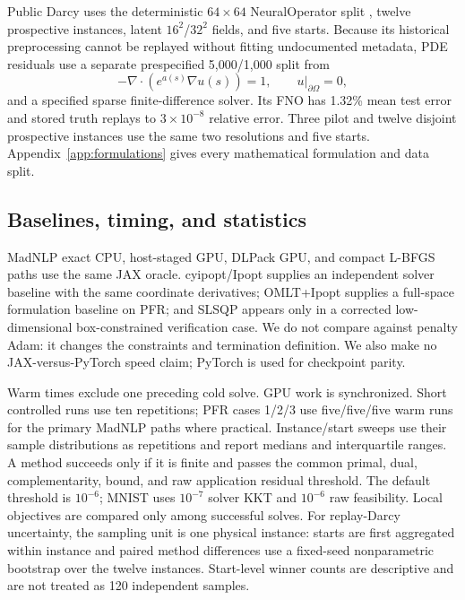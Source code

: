 Public Darcy uses the deterministic $64\times64$ NeuralOperator split
\citep{li2021fno,kovachki2023neuraloperator}, twelve prospective instances,
latent $16^2$/$32^2$ fields, and five starts.  Because its historical
preprocessing cannot be replayed without fitting undocumented metadata, PDE
residuals use a separate prespecified 5,000/1,000 split from
\begin{equation}
-\nabla\!\cdot\!\left(e^{a(s)}\nabla u(s)\right)=1,
\qquad u|_{\partial\Omega}=0,
\label{eq:darcy}
\end{equation}
and a specified sparse finite-difference solver.  Its FNO has 1.32\% mean test
error and stored truth replays to $3\times10^{-8}$ relative error.  Three pilot
and twelve disjoint prospective instances use the same two resolutions and
five starts.  Appendix~\ref{app:formulations} gives every mathematical
formulation and data split.

\subsection{Baselines, timing, and statistics}

MadNLP exact CPU, host-staged GPU, DLPack GPU, and compact L-BFGS paths use the
same JAX oracle.  cyipopt/Ipopt supplies an independent solver baseline with
the same coordinate derivatives; OMLT+Ipopt supplies a full-space formulation
baseline on PFR; and SLSQP appears only in a corrected low-dimensional
box-constrained verification case.  We do not compare against penalty Adam: it
changes the constraints and termination definition.  We also make no
JAX-versus-PyTorch speed claim; PyTorch is used for checkpoint parity.

Warm times exclude one preceding cold solve.  GPU work is synchronized.  Short
controlled runs use ten repetitions; PFR cases 1/2/3 use five/five/five warm
runs for the primary MadNLP paths where practical.  Instance/start sweeps use
their sample distributions as repetitions and report medians and interquartile
ranges.  A method succeeds only if it is finite and passes the common primal,
dual, complementarity, bound, and raw application residual threshold.  The
default threshold is $10^{-6}$; MNIST uses $10^{-7}$ solver KKT and $10^{-6}$
raw feasibility.  Local objectives are compared only among successful solves.
For replay-Darcy uncertainty, the sampling unit is one physical instance:
starts are first aggregated within instance and paired method differences use
a fixed-seed nonparametric bootstrap over the twelve instances.  Start-level
winner counts are descriptive and are not treated as 120 independent samples.

